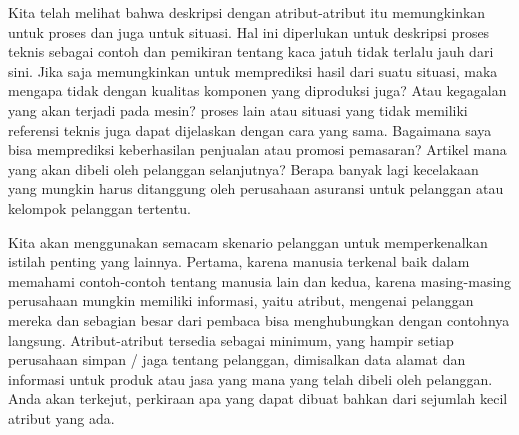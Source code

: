 \par Kita telah melihat bahwa deskripsi dengan atribut-atribut itu memungkinkan untuk proses dan juga untuk situasi. Hal ini diperlukan untuk deskripsi proses teknis sebagai contoh dan pemikiran tentang kaca jatuh tidak terlalu jauh dari sini. Jika saja memungkinkan untuk memprediksi hasil dari suatu situasi, maka mengapa tidak dengan kualitas komponen yang diproduksi juga? Atau kegagalan yang akan terjadi pada mesin? proses lain atau situasi yang tidak memiliki referensi teknis juga dapat dijelaskan dengan cara yang sama. Bagaimana saya bisa memprediksi keberhasilan penjualan atau promosi pemasaran? Artikel mana yang akan dibeli oleh pelanggan selanjutnya? Berapa banyak lagi kecelakaan yang mungkin harus ditanggung oleh perusahaan asuransi untuk pelanggan atau kelompok pelanggan tertentu.

\par Kita akan menggunakan semacam skenario pelanggan untuk memperkenalkan istilah penting yang lainnya. Pertama, karena manusia terkenal baik dalam memahami contoh-contoh tentang manusia lain dan kedua, karena masing-masing perusahaan mungkin memiliki informasi, yaitu atribut, mengenai pelanggan mereka dan sebagian besar dari pembaca bisa menghubungkan dengan contohnya langsung. Atribut-atribut tersedia sebagai minimum, yang hampir setiap perusahaan simpan / jaga tentang pelanggan, dimisalkan data alamat dan informasi untuk produk atau jasa yang mana yang telah dibeli oleh pelanggan. Anda akan terkejut, perkiraan apa yang dapat dibuat bahkan dari sejumlah kecil atribut yang ada.

